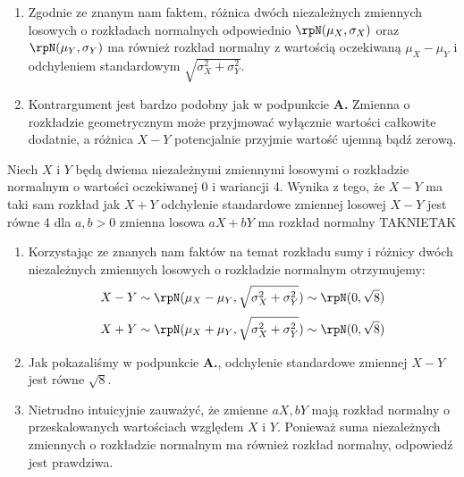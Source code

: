 \begin{solutions}
\begin{enumerate}[\bf A.]
        \item Zgodnie ze znanym nam faktem, różnica dwóch niezależnych zmiennych losowych o rozkładach normalnych odpowiednio $\rpN(\mu_X, \sigma_X)$ oraz $\rpN(\mu_Y, \sigma_Y)$ ma również rozkład normalny z wartością oczekiwaną $\mu_X - \mu_Y$ i odchyleniem standardowym $\sqrt{\sigma_X^2 + \sigma_Y^2}$.

        \item Kontrargument jest bardzo podobny jak w podpunkcie \textbf{A.} Zmienna o rozkładzie geometrycznym może przyjmować wyłącznie wartości całkowite dodatnie, a różnica $X - Y$ potencjalnie przyjmie wartość ujemną bądź zerową.
    \end{enumerate}

    \sol Niech $X$ i $Y$ będą dwiema niezależnymi zmiennymi losowymi o rozkładzie normalnym o wartości oczekiwanej 0 i wariancji 4. Wynika z tego, że
    \answerss
    {$X - Y$ ma taki sam rozkład jak $X + Y$}
    {odchylenie standardowe zmiennej losowej $X - Y$ jest równe 4}
    {dla $a, b > 0$ zmienna losowa $aX + bY$ ma rozkład normalny}
    {TAK}{NIE}{TAK}

    \begin{enumerate}[\bf A.]
        \item Korzystając ze znanych nam faktów na temat rozkładu sumy i różnicy dwóch niezależnych zmiennych losowych o rozkładzie normalnym otrzymujemy:
        $$X - Y \sim \rpN(\mu_X - \mu_Y, \sqrt{\sigma_X^2 + \sigma_Y^2}) \sim \rpN(0, \sqrt{8})$$
        $$X + Y \sim \rpN(\mu_X + \mu_Y, \sqrt{\sigma_X^2 + \sigma_Y^2}) \sim \rpN(0, \sqrt{8})$$

        \item Jak pokazaliśmy w podpunkcie \textbf{A.}, odchylenie standardowe zmiennej $X - Y$ jest równe $\sqrt{8}$.

        \item Nietrudno intuicyjnie zauważyć, że zmienne $aX, bY$ mają rozkład normalny o przeskalowanych wartościach względem $X$ i $Y$. Ponieważ suma niezależnych zmiennych o rozkładzie normalnym ma również rozkład normalny, odpowiedź jest prawdziwa.
    \end{enumerate}
\end{solutions}


